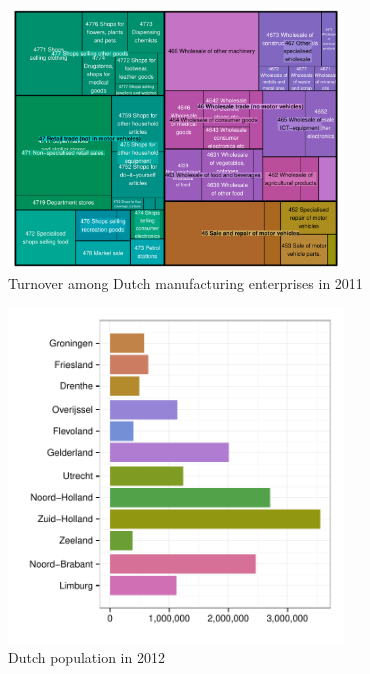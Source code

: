 \documentclass[journal]{vgtc}                %
\begin{document}
\begin{figure}[htb]
  \centering
  \includegraphics[width=3.5in]{TMbusiness.pdf}

  \caption{Turnover among Dutch manufacturing enterprises in 2011}\label{fig:treemapApp}

\end{figure}


\begin{figure}[htb]
  \centering
  \includegraphics[width=3.5in]{pop_bar.pdf}

  \caption{Dutch population in 2012}\label{fig:barApp}

\end{figure}
\end{document}

